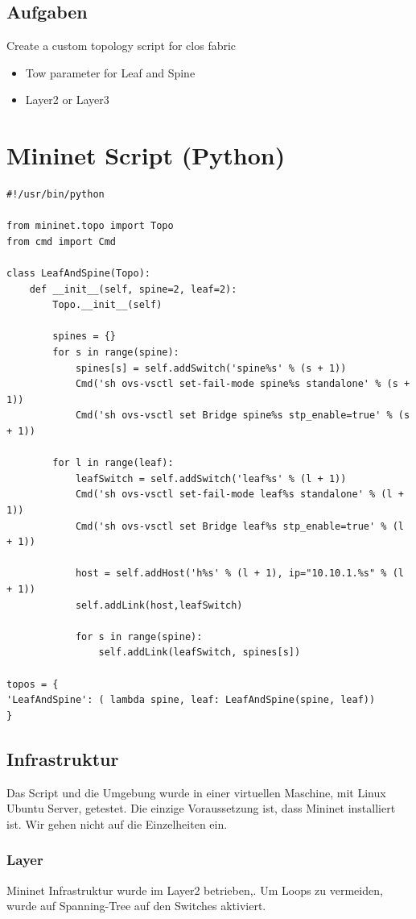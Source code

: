 \documentclass[a4,12pt]{scrartcl}
\begin{document}
\subsection{Aufgaben}
Create a custom topology script for clos fabric
\begin{itemize}
\item Tow parameter for Leaf and Spine
\item Layer2 or Layer3
\end{itemize}

\section{Mininet Script (Python)}
\begin{lstlisting}
#!/usr/bin/python

from mininet.topo import Topo
from cmd import Cmd

class LeafAndSpine(Topo):
    def __init__(self, spine=2, leaf=2):
        Topo.__init__(self)

        spines = {}
        for s in range(spine):
            spines[s] = self.addSwitch('spine%s' % (s + 1))
            Cmd('sh ovs-vsctl set-fail-mode spine%s standalone' % (s + 1))
            Cmd('sh ovs-vsctl set Bridge spine%s stp_enable=true' % (s + 1))

        for l in range(leaf):
            leafSwitch = self.addSwitch('leaf%s' % (l + 1))
            Cmd('sh ovs-vsctl set-fail-mode leaf%s standalone' % (l + 1))
            Cmd('sh ovs-vsctl set Bridge leaf%s stp_enable=true' % (l + 1))
            
            host = self.addHost('h%s' % (l + 1), ip="10.10.1.%s" % (l + 1))
            self.addLink(host,leafSwitch)

            for s in range(spine):
                self.addLink(leafSwitch, spines[s])

topos = { 
'LeafAndSpine': ( lambda spine, leaf: LeafAndSpine(spine, leaf)) 
}
\end{lstlisting}

\subsection{Infrastruktur}
Das Script und die Umgebung wurde in einer virtuellen Maschine, mit Linux Ubuntu Server, getestet. Die einzige Voraussetzung ist, dass Mininet installiert ist. Wir gehen nicht auf die Einzelheiten ein.

\subsubsection{Layer}
Mininet Infrastruktur wurde im Layer2 betrieben,. Um Loops zu vermeiden, wurde auf Spanning-Tree auf den Switches aktiviert. 
\end{document}
